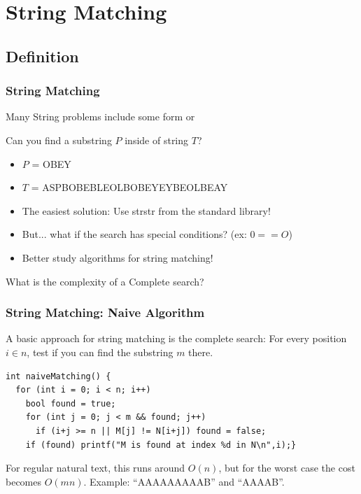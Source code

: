 \documentclass{beamer}
\begin{document}
\section{String Matching} %
\subsection{Definition}

\begin{frame}
  \frametitle{String Matching}

  {\smaller
  \begin{block}{}
    Many String problems include some form or 

    \medskip

    Can you find a substring $P$ inside of string $T$?
  \end{block}
  \begin{itemize}
  \item $P$ = OBEY
  \item $T$ = ASPBOBEBLEOLB\alert{OBEY}EYBEOLBEAY
  \end{itemize}

  \bigskip

  \begin{block}{}
    \begin{itemize}
    \item The easiest solution: Use strstr from the standard library!
    \item But... what if the search has special conditions? (ex: $0 == O$)
    \item Better study algorithms for string matching!
    \end{itemize}
  \end{block}

  What is the complexity of a Complete search?
  
  }
\end{frame}

\begin{frame}[fragile]
  \frametitle{String Matching: Naive Algorithm}

  {\smaller 
    A basic approach for string matching is the complete
    search: For every position $i \in n$, test if you can find the substring
    $m$ there.  

    \bigskip
    
    \begin{exampleblock}{}
\begin{verbatim}
int naiveMatching() {
  for (int i = 0; i < n; i++)
    bool found = true;
    for (int j = 0; j < m && found; j++)
      if (i+j >= n || M[j] != N[i+j]) found = false;
    if (found) printf("M is found at index %d in N\n",i);}
\end{verbatim}
    \end{exampleblock}
    
    \bigskip

    For regular natural text, this runs around $O(n)$, but for the worst case
    the cost becomes $O(mn)$. Example: ``AAAAAAAAAB'' and ``AAAAB''.
  }
\end{frame}
\end{document}
